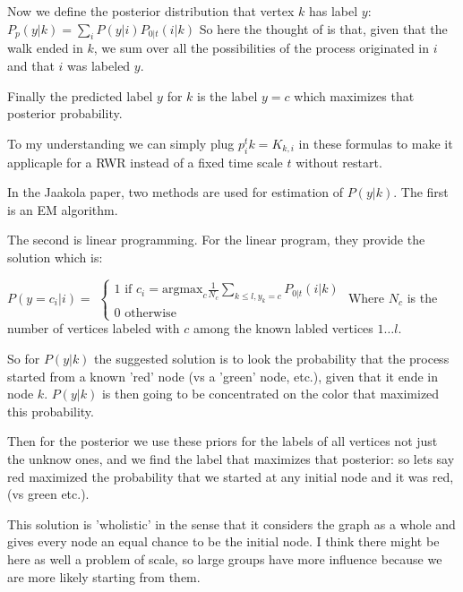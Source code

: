 \documentclass[10pt]{article}
\theoremstyle{definition}
\theoremstyle{remark}
\theoremstyle{plain}
\begin{document}
Now we define the posterior distribution that vertex $k$ has
label 
$y$: 
$P_p(y | k) = \sum_i P(y | i)P_{0 | t}(i | k)$
So here the thought of is that, given that the
walk ended in $k$, we sum over all the possibilities of the process
originated in $i$ and that $i$ was labeled $y$.

Finally the predicted label $y$ for $k$ is the label $y=c$ which
maximizes that posterior probability.

To my understanding we can simply plug $p^t_ik = K_{k,i}$ in these
formulas to make it applicaple for a RWR instead of a fixed time
scale $t$ without restart.

In the Jaakola paper, two methods are used for estimation of
$P(y | k)$. The first is an EM algorithm.

The second is linear programming. For the linear program, they
provide the solution which is:


$P(y=c_i | i) = $
$\begin{cases}
1 \text{ if } c_i = \text{argmax}_c\frac{1}{N_c}
\sum_{k\leq l, y_k=c}P_{0|t}(i|k)\\
0 \text{ otherwise}
\end{cases}
$
Where $N_c$ is the number of vertices labeled with $c$ among 
the known labled vertices $1 \dots l$.

So for $P(y|k)$ the suggested solution is to look the probability
that the process started from a known 'red' node (vs a 'green' node,
etc.), given that it ende in node $k$. $P(y|k)$ is then going to be
concentrated on the color that maximized this probability.

Then for the posterior we use these priors for the labels of all
vertices not just the unknow ones, and we find the label that
maximizes that posterior: so lets say red maximized the probability
that we started at any initial node and it was red, (vs green
etc.). 

This solution is 'wholistic' in the sense that it considers the
graph as a whole and gives every node an equal chance to be the
initial node. I think there might be here as well a problem of
scale, so large groups have more influence because we are more
likely starting from them.
\end{document}

